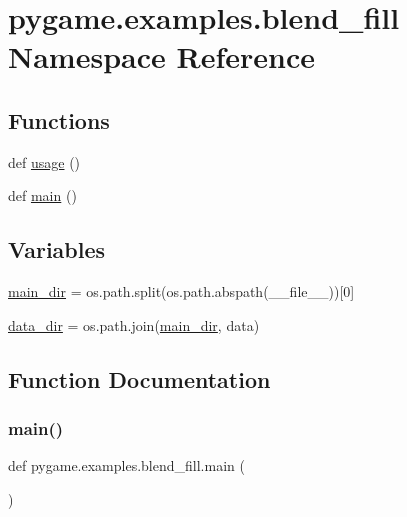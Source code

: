 \hypertarget{namespacepygame_1_1examples_1_1blend__fill}{}\section{pygame.\+examples.\+blend\+\_\+fill Namespace Reference}
\label{namespacepygame_1_1examples_1_1blend__fill}
\subsection*{Functions}
\begin{DoxyCompactItemize}
\item 
def \hyperlink{namespacepygame_1_1examples_1_1blend__fill_a77edc2df2732d35e11c90f519501be17}{usage} ()
\item 
def \hyperlink{namespacepygame_1_1examples_1_1blend__fill_ad934b57781117132176a9a06527e3206}{main} ()
\end{DoxyCompactItemize}
\subsection*{Variables}
\begin{DoxyCompactItemize}
\item 
\hyperlink{namespacepygame_1_1examples_1_1blend__fill_a664197313dbd677d8dcabdaffcaefae5}{main\+\_\+dir} = os.\+path.\+split(os.\+path.\+abspath(\+\_\+\+\_\+file\+\_\+\+\_\+))\mbox{[}0\mbox{]}
\item 
\hyperlink{namespacepygame_1_1examples_1_1blend__fill_ae491099910522fb64a31ac460a427559}{data\+\_\+dir} = os.\+path.\+join(\hyperlink{namespacepygame_1_1examples_1_1blend__fill_a664197313dbd677d8dcabdaffcaefae5}{main\+\_\+dir}, \textquotesingle{}data\textquotesingle{})
\end{DoxyCompactItemize}


\subsection{Function Documentation}
\mbox{\label{namespacepygame_1_1examples_1_1blend__fill_ad934b57781117132176a9a06527e3206}} 
\subsubsection{\texorpdfstring{main()}{main()}}
{\footnotesize\ttfamily def pygame.\+examples.\+blend\+\_\+fill.\+main (\begin{DoxyParamCaption}{ }\end{DoxyParamCaption})}

